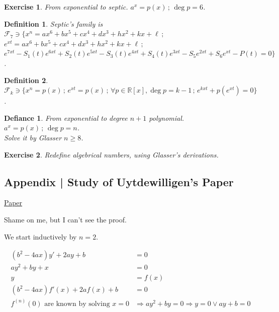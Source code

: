 \documentclass[12pt,a4paper]{article}
\newtheorem{exercise}{Exercise}[section]
\newtheorem{defy}{Defiance}
\newtheorem{definition}{Definition}[section]
\begin{document}
\begin{exercise}
From exponential to septic. $a^x = p(x)\,;\,\deg p = 6$.
\end{exercise}

\begin{definition}
Septic's family is $\mathcal{F}_7 \ni \{ x^n = ax^6 + bx^5 + cx^4 + dx^3 + hx^2 + kx + \ell\,;\,$ \\
$e^{xt} = ax^6 + bx^5 + cx^4 + dx^3 + hx^2 + kx + \ell\,;\,$ \\
$e^{7xt} - S_1(t) e^{6xt} + S_2(t) e^{5xt} - S_3(t) e^{4xt} + S_4(t) e^{3xt} - S_5 e^{2xt} + S_6 e^{xt} - P(t) = 0 \}$.
\end{definition}

\begin{definition}
$\mathcal{F}_k \ni \{ x^n = p(x)\,;\,e^{xt} = p(x)\,;\,\forall p \in \mathbb{R}[x], \deg p = k - 1\,;\,e^{kxt} + p(e^{xt}) = 0 \}$.
\end{definition}

\begin{defy}
From exponential to degree $n + 1$ polynomial. $a^x = p(x)\,;\,\deg p = n$. \\
Solve it by Glasser $n \ge 8$.
\end{defy}

\begin{exercise}
Redefine algebrical numbers, using Glasser's derivations.
\end{exercise}

\subsection{Appendix | Study of Uytdewilligen's Paper}

\href{https://arxiv.org/abs/math/0408264}{\color{blue}\underline{Paper}}

\vspace{3mm}

Shame on me, but I can't see the proof.

We start inductively by $n = 2$.

\begin{align}
(b^2 - 4ax) y' + 2ay + b &= 0 \\
ay^2 + by + x &= 0 \\
y &= f(x) \\
(b^2 - 4ax) f'(x) + 2af(x) + b &= 0 \\
f^{(n)}(0) \text{ are known by solving }x = 0 &\Rightarrow ay^2 + by = 0 \Rightarrow y = 0 \vee ay + b = 0
\end{align}
\end{document}

